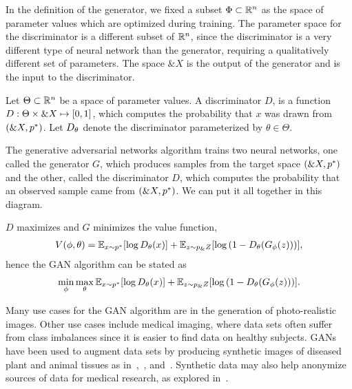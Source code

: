 In the definition of the generator, we fixed a subset
$\Phi \subset \mathbb{R}^n$ as the space of parameter values which are
optimized during training.  The parameter space for the discriminator
is a different subset of $\mathbb{R}^n$, since the discriminator is a very
different type of neural network than the generator, requiring a
qualitatively different set of parameters.  The space $\&X$ is the
output of the generator and is the input to the discriminator.

\begin{definition}%
  \label{def:discriminator}
  Let $\Theta \subset \mathbb{R}^n$ be a space of parameter values. A
  \textnormal{\sffamily discriminator} $D$, is a function
  $D: \Theta \times \&X \mapsto [0, 1]$, which computes the
  probability that $x$ was drawn from $(\&X, p^*)$. Let
  $D_\theta$ denote the discriminator parameterized by $\theta \in \Theta$.
\end{definition}

\begin{definition}
  The \textnormal{\sffamily generative adversarial networks} algorithm
  trains two neural networks, one called the generator $G$, which
  produces samples from the target space $(\&X, p^*)$ and the other,
  called the discriminator $D$, which computes the probability that an
  observed sample came from $(\&X, p^*)$.  We can put it all together
  in this diagram.
  \begin{center}
  \end{center}
  $D$ maximizes and $G$ minimizes the value function,
  \begin{align}
    \label{eq:intro-V}
    V(\phi, \theta) = \mathbb{E}_{x \sim p^*}[{\log D_\theta(x})] +
    \mathbb{E}_{z \sim p_\&Z}[\log{(1 - D_\theta(G_\phi(z)))}],
  \end{align}
  hence the GAN algorithm can be stated as
  \begin{align}
\min_\phi\max_\theta\mathbb{E}_{x \sim p^*}[{\log D_\theta(x})] +
    \mathbb{E}_{z \sim p_\&Z}[\log{(1 - D_\theta(G_\phi(z)))}].
  \end{align}
\end{definition}

Many use cases for the GAN algorithm are in the generation of
photo-realistic images.  Other use cases include medical imaging,
where data sets often suffer from class imbalances since it is easier
to find data on healthy subjects.  GANs have been used to augment data
sets by producing synthetic images of diseased plant and animal
tissues as in~\cite{ref:nazki-2018},~\cite{ref:valerio-2017},
and~\cite{ref:frid-2018}. Synthetic data may also help anonymize
sources of data for medical research, as explored
in~\cite{ref:shin-2018}.

